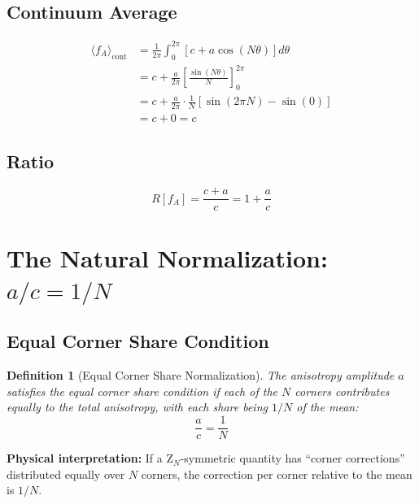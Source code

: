 \documentclass[11pt]{article}
\newtheorem{definition}{Definition}
\begin{document}
\subsection{Continuum Average}

\begin{align}
\langle f_A \rangle_{\text{cont}} &= \frac{1}{2\pi} \int_0^{2\pi} \left[c + a\cos(N\theta)\right] d\theta \\
&= c + \frac{a}{2\pi} \left[\frac{\sin(N\theta)}{N}\right]_0^{2\pi} \\
&= c + \frac{a}{2\pi} \cdot \frac{1}{N}[\sin(2\pi N) - \sin(0)] \\
&= c + 0 = c
\end{align}

\subsection{Ratio}

\begin{equation}
\label{eq:ratio-general}
R[f_A] = \frac{c + a}{c} = 1 + \frac{a}{c}
\end{equation}

\section{The Natural Normalization: $a/c = 1/N$}

\subsection{Equal Corner Share Condition}

\begin{definition}[Equal Corner Share Normalization]
\label{def:equal-corner}
The anisotropy amplitude $a$ satisfies the \emph{equal corner share} condition if each of the $N$ corners contributes equally to the total anisotropy, with each share being $1/N$ of the mean:
\begin{equation}
\frac{a}{c} = \frac{1}{N}
\end{equation}
\end{definition}

\textbf{Physical interpretation:} If a Z$_N$-symmetric quantity has ``corner corrections'' distributed equally over $N$ corners, the correction per corner relative to the mean is $1/N$.
\end{document}
